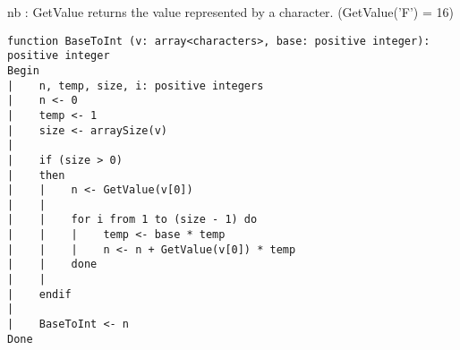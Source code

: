 nb : GetValue returns the value represented by a character. (GetValue('F') = 16)
\begin{lstlisting}[breaklines]
function BaseToInt (v: array<characters>, base: positive integer): positive integer
Begin
|    n, temp, size, i: positive integers
|    n <- 0
|    temp <- 1
|    size <- arraySize(v)
|
|    if (size > 0)
|    then
|    |    n <- GetValue(v[0])
|    |
|    |    for i from 1 to (size - 1) do
|    |    |    temp <- base * temp
|    |    |    n <- n + GetValue(v[0]) * temp
|    |    done
|    |
|    endif
|
|    BaseToInt <- n
Done
\end{lstlisting}

